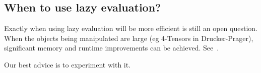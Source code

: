 \subsection{When to use lazy evaluation?}
Exactly when using lazy evaluation will be more efficient is still an open question.
When the objects being manipulated are large (eg 4-Tensors in Drucker-Prager), significant memory and runtime improvements can be achieved.
See~\cite{lazyauspdc}.

Our best advice is to experiment with it.
